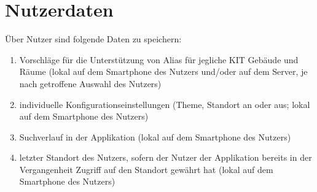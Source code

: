 \section{Nutzerdaten}

Über Nutzer sind folgende Daten zu speichern:
\begin{enumerate}[label=\textbf{/D\arabic*0/}, align=left]
	\item Vorschläge für die Unterstützung von Alias für jegliche KIT Gebäude und Räume (lokal auf dem Smartphone des Nutzers und/oder auf dem Server, je nach getroffene Auswahl des Nutzers)
	\item individuelle Konfigurationseinstellungen (Theme, Standort an oder aus; lokal auf dem Smartphone des Nutzers)
	\item Suchverlauf in der Applikation (lokal auf dem Smartphone des Nutzers)
	\item letzter Standort des Nutzers, sofern der Nutzer der Applikation bereits in der Vergangenheit Zugriff auf den Standort gewährt hat (lokal auf dem Smartphone des Nutzers)
\end{enumerate}